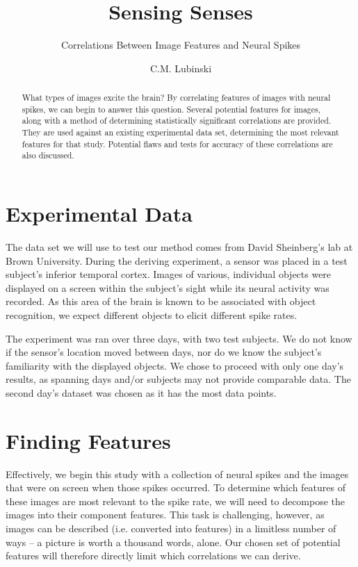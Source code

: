 \documentclass{scrartcl}
\title{Sensing Senses}
\subtitle{Correlations Between Image Features and Neural Spikes}
\author{C.M. Lubinski}
\begin{document}
\maketitle

\begin{abstract}
What types of images excite the brain? By correlating features of images with
neural spikes, we can begin to answer this question. Several potential
features for images, along with a method of determining statistically
significant correlations are provided. They are used against an existing
experimental data set, determining the most relevant features for that study.
Potential flaws and tests for accuracy of these correlations are also
discussed.
\end{abstract}

\section{Experimental Data}
The data set we will use to test our method comes from David Sheinberg's lab
at Brown University. During the deriving experiment, a sensor was placed in a
test subject's inferior temporal cortex. Images of various, individual objects
were displayed on a screen within the subject's sight while its neural
activity was recorded. As this area of the brain is known to be associated
with object recognition, we expect different objects to elicit different spike
rates. 

The experiment was ran over three days, with two test subjects. We do not know
if the sensor's location moved between days, nor do we know the subject's
familiarity with the displayed objects. We chose to proceed with only one
day's results, as spanning days and/or subjects may not provide comparable
data. The second day's dataset was chosen as it has the most data points.

\section{Finding Features}

Effectively, we begin this study with a collection of neural spikes and the
images that were on screen when those spikes occurred. To determine which
features of these images are most relevant to the spike rate, we will need to
decompose the images into their component features. This task is challenging,
however, as images can be described (i.e. converted into features) in a
limitless number of ways -- a picture is worth a thousand words, alone. Our
chosen set of potential features will therefore directly limit which
correlations we can derive.
\end{document}

